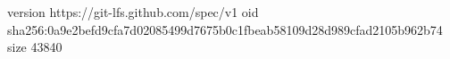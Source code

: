 version https://git-lfs.github.com/spec/v1
oid sha256:0a9e2befd9cfa7d02085499d7675b0c1fbeab58109d28d989cfad2105b962b74
size 43840
